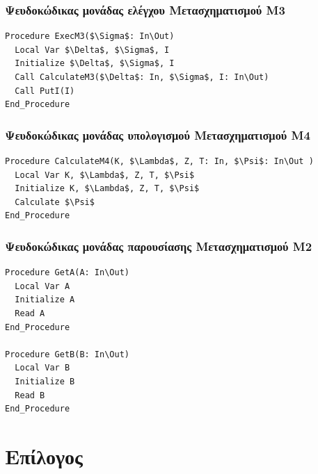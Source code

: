 \documentclass{article}
\begin{document}
\subsubsection{Ψευδοκώδικας μονάδας ελέγχου Μετασχηματισμού Μ3}
\begin{lstlisting}[mathescape]
Procedure ExecM3($\Sigma$: In\Out)
  Local Var $\Delta$, $\Sigma$, I
  Initialize $\Delta$, $\Sigma$, I
  Call CalculateM3($\Delta$: In, $\Sigma$, I: In\Out)
  Call PutI(I)
End_Procedure
\end{lstlisting}

\subsubsection{Ψευδοκώδικας μονάδας υπολογισμού Μετασχηματισμού Μ4}
\begin{lstlisting}[mathescape]
Procedure CalculateM4(K, $\Lambda$, Z, T: In, $\Psi$: In\Out )
  Local Var K, $\Lambda$, Z, T, $\Psi$
  Initialize K, $\Lambda$, Z, T, $\Psi$
  Calculate $\Psi$
End_Procedure
\end{lstlisting}

\subsubsection{Ψευδοκώδικας μονάδας παρουσίασης Μετασχηματισμού Μ2}
\begin{lstlisting}[mathescape]
Procedure GetA(A: In\Out)
  Local Var A
  Initialize A
  Read A
End_Procedure

Procedure GetB(B: In\Out)
  Local Var B
  Initialize B
  Read B
End_Procedure
\end{lstlisting}

\newpage
\section{Επίλογος}
\end{document}
